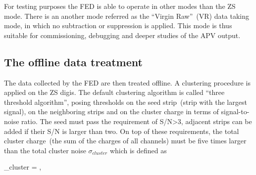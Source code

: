 For testing purposes the FED is able to operate in other modes than the ZS mode. There is an another mode referred as the ``Virgin Raw''~(VR) data taking mode, in which no subtraction or suppression is applied. This mode is thus suitable for commissioning, debugging and deeper studies of the APV output.





\subsection{The offline data treatment}


The data collected by the FED are then treated offline. A clustering procedure is applied on the ZS digis. The default clustering algorithm is called ``three threshold algorithm'', posing thresholds on the seed strip~(strip with the largest signal), on the neighboring strips and on the cluster charge in terms of signal-to-noise ratio. The seed must pass the requirement of S/N>3, adjacent strips can be added if their S/N is larger than two. On top of these requirements, the total cluster charge~(the sum of the charges of all channels) must be five times larger than the total cluster noise $\sigma_{cluster}$ which is defined as


{
    \sigma_{cluster} = ,
}

